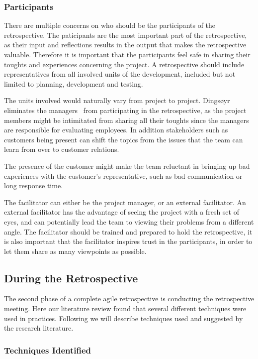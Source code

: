 \documentclass[12pt]{article}
\begin{document}
\subsubsection{Participants}
There are multiple concerns on who should be the participants of the retrospective.  The paticipants are the most important part of the retrospective, as their input and reflections results in the output that makes the retrospective valuable. Therefore it is important that the participants feel safe in sharing their toughts and experiences concerning the project. A retrospective should include representatives from all involved units of the development, included but not limited to planning, development and testing. 

The units involved would naturally vary from project to project. Dingsøyr eliminates the managers~\cite{Dingsoyr2005} from participating in the retrospective, as the project members might be intimitated from sharing all their toughts since the managers are responsible for evaluating employees. In addition stakeholders such as customers being present can shift the topics from the issues that the team can learn from over to customer relations. 

The presence of the customer might make the team reluctant in bringing up bad experiences with the customer's representative, such as bad communication or long response time. 

The facilitator can either be the project manager, or an external facilitator. An external facilitator has the advantage of seeing the project with a fresh set of eyes, and can potentially lead the team to viewing their problems from a different angle. The facilitator should be trained and prepared to hold the retrospective, it is also important that the facilitator inspires trust in the participants, in order to let them share as many viewpoints as possible.

\subsection{During the Retrospective}
The second phase of a complete agile retrospective is conducting the retrospective meeting. Here our literature review found that several different techniques were used in practices. Following we will describe techniques used and suggested by the research literature.

\subsubsection{Techniques Identified}
\end{document}
